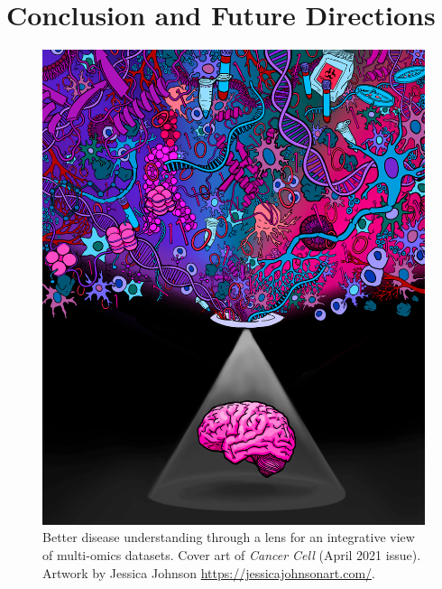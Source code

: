 \chapter{Conclusion and Future Directions}
\label{chap:conclusion}


\begin{figure}[tb]
    \centering
    \includegraphics[width=0.6\linewidth]{figures/chap05_conclusion/cptac_gbm_cancer_cell_cover.png}
    \caption[Better disease understanding through a lens for an integrative view of multi-omics datasets.]{Better disease understanding through a lens for an integrative view of multi-omics datasets. Cover art of \textit{Cancer Cell} (April 2021 issue). Artwork by Jessica Johnson \url{https://jessicajohnsonart.com/}.}
    \label{fig:lens-multi-omics}
\end{figure}
